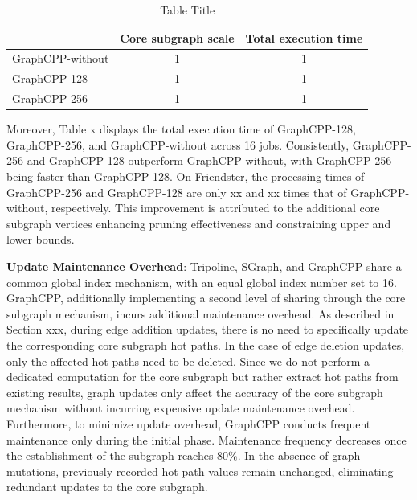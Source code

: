 \documentclass[lettersize,journal]{IEEEtran} %
\begin{document}
\begin{table}[htbp]
    \centering
    \caption{Table Title}
    \label{tab:mytable}
    \begin{tabular}{|l|c|c|}
      \hline
      & Core subgraph scale  & Total execution time \\
      \hline
      GraphCPP-without & 1 & 1 \\
      GraphCPP-128 & 1 & 1 \\
      GraphCPP-256 & 1 & 1 \\
      \hline
    \end{tabular}
  \end{table}

Moreover, Table x displays the total execution time of GraphCPP-128, GraphCPP-256, and GraphCPP-without across 16 jobs. Consistently, GraphCPP-256 and GraphCPP-128 outperform GraphCPP-without, with GraphCPP-256 being faster than GraphCPP-128. On Friendster, the processing times of GraphCPP-256 and GraphCPP-128 are only xx and xx times that of GraphCPP-without, respectively. This improvement is attributed to the additional core subgraph vertices enhancing pruning effectiveness and constraining upper and lower bounds.

{\bf{Update Maintenance Overhead}}: Tripoline\cite{tripoline}, SGraph\cite{sgraph}, and GraphCPP share a common global index mechanism, with an equal global index number set to 16. GraphCPP, additionally implementing a second level of sharing through the core subgraph mechanism, incurs additional maintenance overhead. As described in Section xxx, during edge addition updates, there is no need to specifically update the corresponding core subgraph hot paths. In the case of edge deletion updates, only the affected hot paths need to be deleted. Since we do not perform a dedicated computation for the core subgraph but rather extract hot paths from existing results, graph updates only affect the accuracy of the core subgraph mechanism without incurring expensive update maintenance overhead. Furthermore, to minimize update overhead, GraphCPP conducts frequent maintenance only during the initial phase. Maintenance frequency decreases once the establishment of the subgraph reaches 80\%. In the absence of graph mutations, previously recorded hot path values remain unchanged, eliminating redundant updates to the core subgraph.
\end{document}

